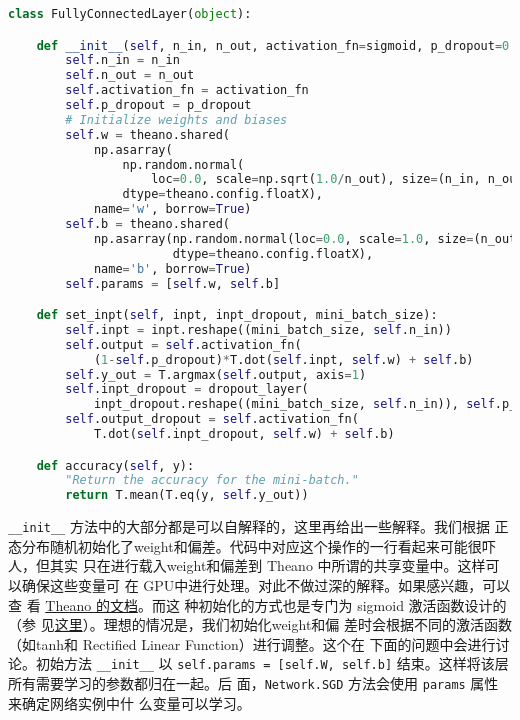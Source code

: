 \begin{lstlisting}[language=Python]
class FullyConnectedLayer(object):

    def __init__(self, n_in, n_out, activation_fn=sigmoid, p_dropout=0.0):
        self.n_in = n_in
        self.n_out = n_out
        self.activation_fn = activation_fn
        self.p_dropout = p_dropout
        # Initialize weights and biases
        self.w = theano.shared(
            np.asarray(
                np.random.normal(
                    loc=0.0, scale=np.sqrt(1.0/n_out), size=(n_in, n_out)),
                dtype=theano.config.floatX),
            name='w', borrow=True)
        self.b = theano.shared(
            np.asarray(np.random.normal(loc=0.0, scale=1.0, size=(n_out,)),
                       dtype=theano.config.floatX),
            name='b', borrow=True)
        self.params = [self.w, self.b]

    def set_inpt(self, inpt, inpt_dropout, mini_batch_size):
        self.inpt = inpt.reshape((mini_batch_size, self.n_in))
        self.output = self.activation_fn(
            (1-self.p_dropout)*T.dot(self.inpt, self.w) + self.b)
        self.y_out = T.argmax(self.output, axis=1)
        self.inpt_dropout = dropout_layer(
            inpt_dropout.reshape((mini_batch_size, self.n_in)), self.p_dropout)
        self.output_dropout = self.activation_fn(
            T.dot(self.inpt_dropout, self.w) + self.b)

    def accuracy(self, y):
        "Return the accuracy for the mini-batch."
        return T.mean(T.eq(y, self.y_out))
\end{lstlisting}

\lstinline!__init__! 方法中的大部分都是可以自解释的，这里再给出一些解释。我们根据
正态分布随机初始化了\gls*{weight}和偏差。代码中对应这个操作的一行看起来可能很吓人，但其实
只在进行载入\gls*{weight}和偏差到 Theano 中所谓的共享变量中。这样可以确保这些变量可
在 GPU中进行处理。对此不做过深的解释。如果感兴趣，可以查
看 \href{http://deeplearning.net/software/theano/index.html}{Theano 的文档}。而这
种初始化的方式也是专门为 sigmoid 激活函数设计的（参
见\hyperref[sec:weight_initialization]{这里}）。理想的情况是，我们初始化\gls*{weight}和偏
差时会根据不同的激活函数（如\gls*{tanh}和 Rectified Linear Function）进行调整。这个在
下面的问题中会进行讨论。初始方法 \lstinline!__init__! 以 
\lstinline!self.params = [self.W, self.b]! 结束。这样将该层所有需要学习的参数都归在一起。后
面，\lstinline!Network.SGD! 方法会使用 \lstinline!params! 属性来确定网络实例中什
么变量可以学习。

